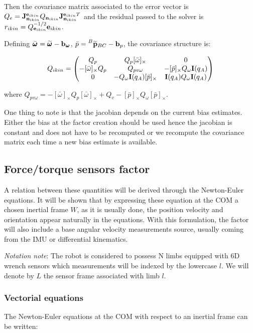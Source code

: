 \documentclass[11pt]{article}
\newcommand{\noise}{\bfn}
\newcommand{\bias}{\bfb}
\newcommand{\posim}[2]{\prescript{#1}{}{\widetilde{\bfp}}_{#2}}
\newcommand{\angvel}[2]{\prescript{#1}{}{\pmb{\omega}}_{#2}}
\newcommand{\angvelm}[2]{\prescript{#1}{}{\widetilde{\pmb{\omega}}}_{#2}}
\begin{document}
Then the covariance matrix associated to the error vector is $Q_e = \bfJ^{\bfe_{ikin}}_{\noise_{ikin}} Q_{\noise_{ikin}} \bfJ^{\bfe_{ikin} T}_{\noise_{ikin}}$ and the residual passed to the solver is $r_{ikin} = Q_{{\bf e}_{ikin}}^{-1/2} {\bf e}_{ikin}$.

Defining $\bar{\angvel{}{}} = \angvelm{}{} - \bias_{\angvel{}{}}$,  $\bar{p} = \posim{B}{BC} - \bias_p$, the covariance structure is:

\begin{equation}
Q_{ikin} = 
\begin{pmatrix}
Q_p  &  Q_p[\bar{\omega}]_{\times} & 0
\\
-[\bar{\omega}]_{\times}Q_p & Q_{pv\omega}& -[\bar{p}]_{\times}Q_{\omega}{\bf I}(q_A)
\\
0 & -Q_{\omega}{\bf I}(q_A)[\bar{p}]_{\times} & {\bf I}(q_A)Q_{\omega}{\bf I}(q_A)
\end{pmatrix}
\end{equation}

where $Q_{pv\omega} = -[\bar{\omega}]_{\times}Q_p[\bar{\omega}]_{\times} + Q_v - [\bar{p}]_{\times}Q_{\omega}[\bar{p}]_{\times} $.

One thing to note is that the jacobian depends on the current bias estimates. Either the bias at the factor creation should be used hence the jacobian is constant and does not have to be recomputed or we recompute the covariance matrix each time a new bias estimate is available.


\subsection{Force/torque sensors factor}
A relation between these quantities will be derived through the Newton-Euler equations. It will be shown that by expressing these equation at the COM a chosen inertial frame $W$, as it is usually done, the position velocity and orientation appear naturally in the equations.
With this formulation, the factor will also include a base angular velocity measurements source, usually coming from the IMU or differential kinematics.

\textit{Notation note}: The robot is considered to possess N limbs equipped with 6D wrench sensors which measurements will be indexed by the lowercase $l$. We will denote by $L$ the sensor frame associated with limb $l$.

\subsubsection{Vectorial equations}
The Newton-Euler equations at the COM with respect to an inertial frame can be written:
\end{document}
